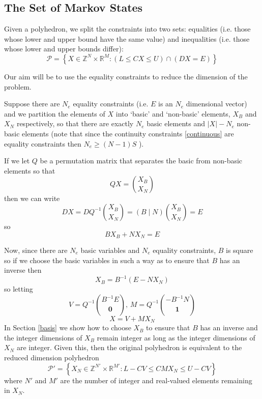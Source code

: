\documentclass{article}
\begin{document}
\subsection{The Set of Markov States}

Given a polyhedron, we split the constraints into two sets: equalities (i.e. those whose lower and upper bound have the same value) and inequalities (i.e. those whose lower and upper bounds differ):
\begin{equation}
\mathcal{P} = \left\{X \in \mathbb{Z}^N \times \mathbb{R}^M: \left(L \le CX \le U\right) \cap \left(DX = E\right) \right\}
\label{zPolySupport}
\end{equation}

Our aim will be to use the equality constraints to reduce the dimension of the problem.

Suppose there are $N_e$ equality constraints (i.e. $E$ is an $N_e$ dimensional vector) and we partition the elements of $X$ into `basic' and `non-basic' elements, $X_B$ and $X_N$ respectively, so that there are exactly $N_e$ basic elements and $|X| - N_e$ non-basic elements (note that since the continuity constraints \eqref{continuous} are equality constraints then $N_e \ge (N-1)S$ ).

If we let $Q$ be a permutation matrix that separates the basic from non-basic elements so that
\[
QX = {X_B \choose X_N}
\]
then we can write
\[
DX = DQ^{-1}{X_B \choose X_N} = \left(B \mid N\right){X_B \choose X_N} = E
\]
so
\begin{equation}
BX_B + NX_N = E
\label{eqconstraints}
\end{equation}

Now, since there are $N_e$ basic variables and $N_e$ equality constraints, $B$ is square so if we choose the basic variables in such a way as to ensure that $B$ has an inverse then
\begin{equation}
X_B = B^{-1}(E - NX_N)
\label{basicvars}
\end{equation}
so letting
\[
V = Q^{-1}{B^{-1}E \choose \mathbf{0}}, \, M = Q^{-1}{-B^{-1}N \choose \mathbf{1}}
\]
\begin{equation}
X = V + MX_N
\label{markovtotrajectory}
\end{equation}
In Section \ref{basis} we show how to choose $X_B$ to ensure that $B$ has an inverse and the integer dimensions of $X_B$ remain integer as long as the integer dimensions of $X_N$ are integer. Given this, then the original polyhedron is equivalent to the reduced dimension polyhedron
\begin{equation}
\mathcal{P}' = \left\{X_N \in \mathbb{Z}^{N'} \times \mathbb{R}^{M'}: L-CV \le  CMX_N \le U-CV\right\}
\label{reducedPolySupport}
\end{equation}
where $N'$ and $M'$ are the number of integer and real-valued elements remaining in $X_N$.
\end{document}
